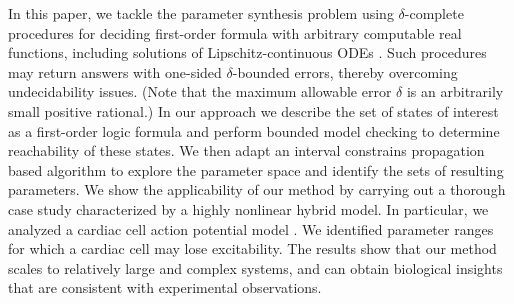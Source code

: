 In this paper, we tackle the parameter synthesis problem using $\delta$-complete procedures \cite{gao12a} 
for deciding first-order formula with arbitrary computable real functions, including solutions 
of Lipschitz-continuous ODEs \citep{gao12b}. Such procedures may return answers with
one-sided $\delta$-bounded errors, thereby overcoming undecidability issues. (Note that the maximum 
allowable error $\delta$ is an arbitrarily small positive rational.) In our approach we describe 
the set of states of interest as a first-order logic formula 
and perform bounded model checking to determine reachability of these states. We then adapt an 
interval constrains propagation based algorithm to explore the parameter space and identify the 
sets of resulting parameters. 
We show the applicability of our method by carrying out a thorough case study characterized by 
a highly nonlinear hybrid model. In particular, we analyzed a cardiac cell action potential
model \cite{orovio08}. We identified parameter ranges for which a cardiac cell may lose excitability.
The results show that our method scales to relatively large and complex systems, and can obtain 
biological insights that are consistent with experimental observations.


